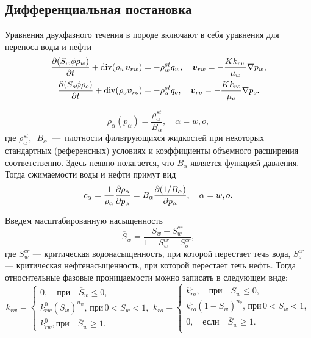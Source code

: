 \subsection{Дифференциальная постановка}
Уравнения двухфазного течения в породе включают в себя уравнения для переноса воды и нефти
\begin{equation}\label{eq:egor_common_equation_multiphase_rho}
\begin{split}
	\dfrac{\partial (S_w \phi \rho_w)}{\partial t} + \operatorname{div}(\rho_w \bm{v}_{rw})    &= - \rho^{st}_w q_w, \quad \bm{v}_{rw}=-\frac{K k_{rw}}{\mu_w}\nabla p_w,\\
	\dfrac{\partial (S_o \phi \rho_o)}{\partial t} + \operatorname{div}(\rho_o \bm{v}_{ro})  &= - \rho^{st}_o q_o, \quad \bm{v}_{ro}=-\frac{K k_{ro}}{\mu_o}\nabla p_o.
\end{split}
\end{equation}

$$
\rho_\alpha(p_\alpha) = \frac{\rho^{st}_\alpha}{B_\alpha}, \quad \alpha = w,o,
$$
где $\rho^{st}_\alpha,$~$B_\alpha$~---~плотности фильтрующихся жидкостей при некоторых стандартных (референсных) условиях и  коэффициенты объемного расширения соответственно. 
Здесь неявно полагается, что $B_\alpha$ является функцией давления.
Тогда сжимаемости воды и нефти примут вид 
\begin{equation}\label{eq:sibin_c_alpha}
c_\alpha = \frac{1}{\rho_\alpha} \dfrac{\partial \rho_\alpha}{\partial p_\alpha} = B_\alpha \dfrac{\partial (1 / B_\alpha)}{\partial p_\alpha}, \quad \alpha = w,o.
\end{equation}

Введем масштабированную насыщенность
\begin{equation}\label{eq:star:mod:Sw}
 \overline {S}_w= \frac{S_w-S_w^{cr}}{1-S_w^{cr}-S_o^{cr}},
\end{equation}
где $S_w^{cr}$ --- критическая водонасыщенность, при которой перестает течь вода, $S_o^{cr}$ --- критическая нефтенасыщенность, при которой перестает течь нефть. Тогда относительные фазовые проницаемости можно записать в следующем виде:
\begin{equation}\label{eq:star:mod:RelatPerm}
	k_{rw}= \begin{cases}
	0, \quad \text{при}\quad \overline {S}_w \leq 0,\\
	k_{rw}^0 (\overline {S}_w)^{n_w}, \,\text{при}\,0<\overline {S}_w <1, \\
	k_{rw}^0, \text{при}\quad \overline {S}_w \geq 1.
   \end{cases}
   k_{ro}=\begin{cases}
	k_{ro}^0, \quad \text{при}\quad \overline {S}_w \leq 0, \\
	k_{ro}^0 (1-\overline {S}_w)^{n_o}, \, \text{при}\,0<\overline {S}_w<1 , \\
   0, \quad \text{если}\quad \overline {S}_w \geq 1.\\
   \end{cases}
\end{equation}

